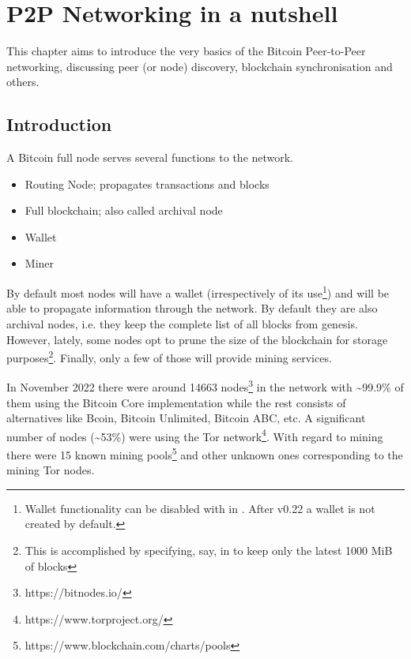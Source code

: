 \chapter{P2P Networking in a nutshell}
\label{ch:p2p-networking}

\begin{summary}
This chapter aims to introduce the very basics of the Bitcoin Peer-to-Peer networking, discussing peer (or node) discovery, blockchain synchronisation and others. 
\end{summary}

\section{Introduction}
A Bitcoin full node serves several functions to the network.

\begin{itemize}
\item Routing Node; propagates transactions and blocks
\item Full blockchain; also called archival node
\item Wallet
\item Miner
\end{itemize}

By default most nodes will have a wallet (irrespectively of its use\footnote{Wallet functionality can be disabled with  in . After v0.22 a wallet is not created by default.}) and will be able to propagate information through the network. By default they are also archival nodes, i.e. they keep the complete list of all blocks from genesis. However, lately, some nodes opt to prune the size of the blockchain for storage purposes\footnote{This is accomplished by specifying, say,   in  to keep only the latest 1000 MiB of blocks}. Finally, only a few of those will provide mining services.

In November 2022 there were around 14663 nodes\footnote{https://bitnodes.io/} in the network with \textasciitilde 99.9\% of them using the Bitcoin Core implementation while the rest consists of alternatives like Bcoin, Bitcoin Unlimited, Bitcoin ABC, etc. A significant number of nodes (\textasciitilde 53\%) were using the Tor network\footnote{https://www.torproject.org/}. With regard to mining there were 15 known mining pools\footnote{https://www.blockchain.com/charts/pools} and other unknown ones corresponding to the mining Tor nodes.


